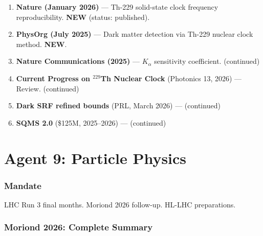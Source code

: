 \documentclass[11pt,a4paper]{article}
\newcommand{\NEW}{\textcolor{dfdblue}{\textbf{NEW}}}
\begin{document}
\begin{enumerate}
\item \textbf{Nature (January 2026)} --- Th-229 solid-state clock frequency reproducibility. \NEW{} (status: published).
\item \textbf{PhysOrg (July 2025)} --- Dark matter detection via Th-229 nuclear clock method. \NEW.
\item \textbf{Nature Communications (2025)} --- $K_\alpha$ sensitivity coefficient. (continued)
\item \textbf{Current Progress on $^{229}$Th Nuclear Clock} (Photonics 13, 2026) --- Review. (continued)
\item \textbf{Dark SRF refined bounds} (PRL, March 2026) --- (continued)
\item \textbf{SQMS 2.0} (\$125M, 2025--2026) --- (continued)
\end{enumerate}


\part{Agent 9: Particle Physics}
\label{part:agent9}

\section{Mandate}

LHC Run 3 final months. Moriond 2026 follow-up. HL-LHC preparations.

\section{Moriond 2026: Complete Summary}
\end{document}
